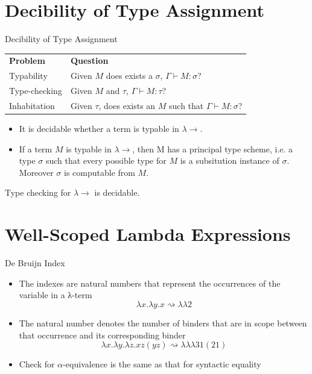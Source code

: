 \documentclass[10pt, xetex, hyperref={pdfpagelabels=false}]{beamer}
\begin{document}
\section{Decibility of Type Assignment}
\begin{frame}{Decibility of Type Assignment~\citep{barendregt2013lambda}}
\begin{tabular}{ll}
{\color{blu} \textbf{Problem}} & {\color{blu} \textbf{Question}} \\
{\color{blu} Typability}       & Given $M$ does exists a $σ$, $Γ⊢ M : σ$? \\
{\color{blu} Type-checking}    & Given $M$ and $τ$, $Γ⊢ M : τ$?  \\
{\color{blu} Inhabitation}     & Given $τ$, does exists an $M$ such that $Γ⊢ M : σ$?\\
\end{tabular}
\pause
\begin{theorem}%
\begin{itemize}
\item It is decidable whether a term is typable in $\lambda\rightarrow$.
\item If a term $M$ is typable in $\lambda\rightarrow$, then M has a principal type scheme, i.e.
a type $σ$ such that every possible type for $M$ is a subsitution instance of $σ$.
Moreover $σ$ is computable from $M$.
\end{itemize}
\end{theorem}

\begin{theorem}%
Type checking for $\lambda\rightarrow$ is decidable.
\end{theorem}

\end{frame}

\section{Well-Scoped Lambda Expressions}
\begin{frame}{De Bruijn Index}
\begin{itemize}
\item The indexes are natural numbers that represent the occurrences of the variable in a λ-term
$$  λx. λy. x ⇝  λ λ 2$$
\item The natural number denotes the number of binders that are in scope between that occurrence and its corresponding binder
$$λx. λy. λz. x z (y z)  ⇝ λ λ λ 3 1 (2 1)$$
\item Check for $α$-equivalence is the same as that for syntactic equality
\end{itemize}
\end{frame}
\end{document}
